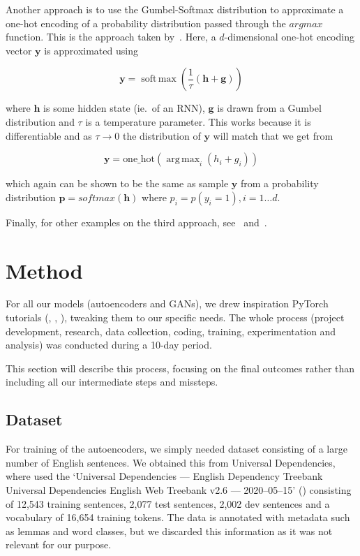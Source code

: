 \documentclass{article}
\DeclareMathOperator*{\argmax}{arg\,max}
\DeclareMathOperator*{\softmax}{soft\,max}
\begin{document}
Another approach is to use the Gumbel-Softmax distribution to approximate a
one-hot encoding of a probability distribution passed through the $argmax$
function. This is the approach taken by~\cite{kusner2016gans}. Here, a
$d$-dimensional one-hot encoding vector $\bm{y}$ is approximated using

\begin{equation}
    \bm{y} = \softmax(\frac{1}{\tau}(\bm{h}+\bm{g}))
\end{equation}

where $\bm{h}$ is some hidden state (ie.\ of an RNN), $\bm{g}$ is drawn from a
Gumbel distribution and $\tau$ is a temperature parameter. This works because it
is differentiable and as $\tau \to 0$ the distribution of $\bm{y}$ will match
that we get from

\begin{equation}
    \bm{y} = \text{one\_hot}(\argmax_{i}(h_i + g_i))
\end{equation}

which again can be shown to be the same as sample $\bm{y}$ from a probability
distribution $\bm{p} = softmax(\bm{h})$ where $p_i = p(y_i=1), i = 1\dots d$.

Finally, for other examples on the third approach,
see~\cite{donahue2018adversarial} and~\cite{haidar2019textkdgan}.


\section{Method}\label{sec:method}

For all our models (autoencoders and GANs), we drew inspiration PyTorch
tutorials
(\cite{pytorchTutorialAtt}, \cite{pytorchTutorialTransformer}, \cite{pytorchTutorialGAN}),
tweaking them to our specific needs. The whole process (project development,
research, data collection, coding, training, experimentation and analysis) was
conducted during a 10-day period.

This section will describe this process, focusing on the final outcomes rather
than including all our intermediate steps and missteps.

\subsection{Dataset}\label{sec:dataset}

For training of the autoencoders, we simply needed dataset consisting of a large
number of English sentences. We obtained this from Universal Dependencies, where
used the `Universal Dependencies --- English Dependency Treebank Universal
Dependencies English Web Treebank v2.6 --- 2020--05--15' (\cite{silveira14gold})
consisting of 12,543 training sentences, 2,077 test sentences, 2,002 dev
sentences and a vocabulary of 16,654 training tokens. The data is annotated with
metadata such as lemmas and word classes, but we discarded this information as
it was not relevant for our purpose.
\end{document}
